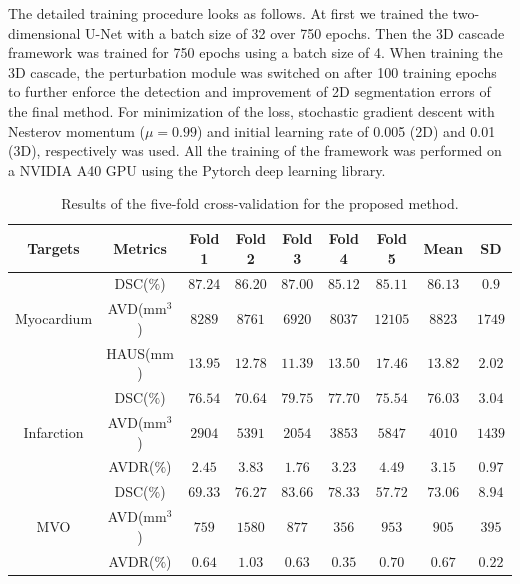 \documentclass[preprint,5p,authoryear]{elsarticle}
\begin{document}
The detailed training procedure looks as follows. At first we trained the two-dimensional U-Net with a batch size of 32 over 750 epochs. Then the 3D cascade framework was trained for 750 epochs using a batch size of 4. When training the 3D cascade, the perturbation module was switched on after 100 training epochs to further enforce the detection and improvement of 2D segmentation errors of the final method. For minimization of the loss, stochastic gradient descent with Nesterov momentum ($\mu=0.99$) and initial learning rate of 0.005 (2D) and 0.01 (3D), respectively was used. All the training of the framework was performed on a NVIDIA A40 GPU using the Pytorch deep learning library. 


\begin{table}[!t]
\caption{\label{tab:5fold}Results of the five-fold cross-validation for the proposed method.}
\centering
\begin{tabular}{c c c c c c c c c}
\hline
Targets   & Metrics              & Fold 1  & Fold 2  & Fold 3  & Fold 4  & Fold 5  & Mean       & SD  \\
\hline
           & DSC($\%$)           & $87.24$ & $86.20$ & $87.00$ & $85.12$ & $85.11$ & $86.13$    & $0.9$ \\
Myocardium & AVD($\mathrm{mm^3}$)& $8289$  & $8761$  & $6920$  & $8037$  & $12105$ & $8823$     & $1749$\\
           & HAUS($\mathrm{mm}$) & $13.95$ & $12.78$ & $11.39$ & $13.50$ & $17.46$ & $13.82$    & $2.02 $\\
\hline
           & DSC($\%$)           & $76.54$ & $70.64$ & $79.75$ & $77.70$ & $75.54$ & $76.03$    & $3.04$\\
Infarction & AVD($\mathrm{mm^3}$)& $2904$  & $5391$  & $2054$  & $3853$  & $5847$  & $4010$     & $1439$\\
           & AVDR($\%$)          & $2.45$  & $3.83$  & $1.76$  & $3.23$  & $4.49$  & $3.15$     & $0.97$\\
\hline
           & DSC($\%$)           & $69.33$ & $76.27$ & $83.66$ & $78.33$ & $57.72$ & $73.06$    & $8.94$\\
MVO        & AVD($\mathrm{mm^3}$)& $759$   & $1580$  & $877$   & $356$   & $953$   & $905$      & $395$\\
           & AVDR($\%$)          & $0.64$  & $1.03$  & $0.63$  & $0.35$  & $0.70$  & $0.67$     & $0.22$\\
\hline
\end{tabular}
\end{table}
\end{document}
